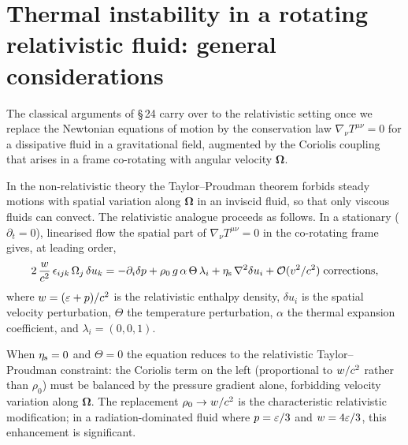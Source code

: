 %

\section{Thermal instability in a rotating relativistic fluid: general considerations}
\label{sec:rel-3-24}

The classical arguments of \S\,24 carry over to the relativistic setting
once we replace the Newtonian equations of motion by the conservation law
$\nabla_\nu T^{\mu\nu} = 0$ for a dissipative fluid in a gravitational
field, augmented by the Coriolis coupling that arises in a frame
co-rotating with angular velocity $\boldsymbol{\Omega}$.

In the non-relativistic theory the Taylor--Proudman theorem forbids
steady motions with spatial variation along $\boldsymbol{\Omega}$ in an
inviscid fluid, so that only viscous fluids can convect.  The relativistic
analogue proceeds as follows.  In a stationary ($\partial_t = 0$),
linearised flow the spatial part of $\nabla_\nu T^{\mu\nu} = 0$ in the
co-rotating frame gives, at leading order,
\begin{equation}\label{eq:rel-3-TP}
  2\,\frac{w}{c^2}\,\epsilon_{ijk}\,\Omega_j\,\delta u_k
  = -\partial_i \delta p + \rho_0\,g\,\alpha\,\Theta\,\lambda_i
    + \eta_{\mathrm{s}}\,\nabla^2 \delta u_i
    + \mathcal{O}(v^2/c^2)\;\text{corrections},
\end{equation}
where $w = (\varepsilon + p)/c^{2}$ is the relativistic enthalpy density,
$\delta u_i$ is the spatial velocity perturbation, $\Theta$ the
temperature perturbation, $\alpha$ the thermal expansion coefficient,
and $\lambda_i = (0,0,1)$.

When $\eta_{\mathrm{s}} = 0$ and $\Theta = 0$ the equation reduces to the
relativistic Taylor--Proudman constraint: the Coriolis term on the left
(proportional to $w/c^2$ rather than $\rho_0$) must be balanced
by the pressure gradient alone, forbidding velocity variation along
$\boldsymbol{\Omega}$.  The replacement $\rho_0 \to w/c^2$ is the
characteristic relativistic modification; in a radiation-dominated fluid
where $p = \varepsilon/3$ and $w = 4\varepsilon/3$, this enhancement
is significant.

